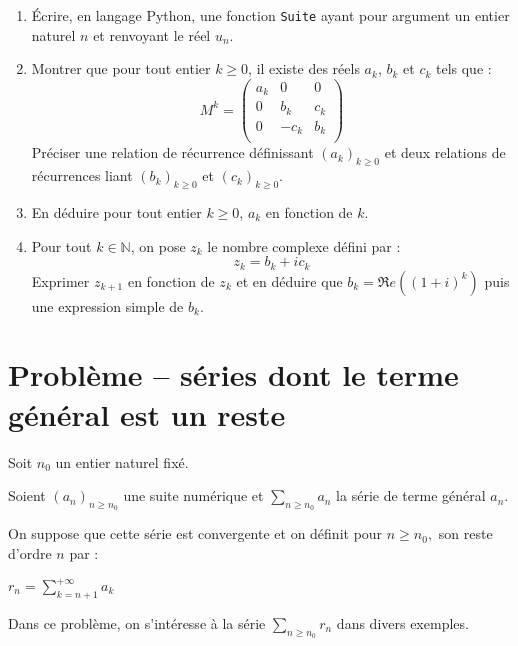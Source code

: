 \documentclass[twoside,french,11pt]{VcCours}
\begin{document}
\begin{enumerate}
\item Écrire, en langage Python, une fonction {\tt Suite} ayant pour argument un entier naturel $n$ et renvoyant le réel $u_n$.
\item Montrer que pour tout entier $k \geq 0$, il existe des réels $a_k$, $b_k$ et $c_k$ tels que :
$$ M^k = \begin{pmatrix}
a_k & 0 & 0 \\
0 & b_k & c_k \\
0 & -c_k & b_k \\
\end{pmatrix}$$
Préciser une relation de récurrence définissant $(a_k)_{k \geq 0}$ et deux relations de récurrences liant $(b_k)_{k \geq 0}$ et $(c_k)_{k \geq 0}$.
\item En déduire pour tout entier $k \geq 0$, $a_k$ en fonction de $k$.
\item Pour tout $k \in \mathbb{N}$, on pose $z_k$ le nombre complexe défini par :
$$ z_k = b_k + i c_k$$
Exprimer $z_{k+1}$ en fonction de $z_k$ et en déduire que $b_k = \Re e((1+i)^k)$ puis une expression simple de $b_k$.
\end{enumerate}

  
\section*{Problème -- séries dont le terme général est un reste}
  Soit $n_0$ un entier naturel fixé.

  Soient $(a_n)_{n\geq n_0}$ une suite numérique et $\sum_{n \geq n_0} a_n$ la
  série de terme général $a_n.$ 
  
  \medskip
  
  On suppose que cette série est convergente et on définit pour $n\geq n_0,$ son reste
  d'ordre $n$ par :
  \begin{center}$r_n=\sum_{k=n+1}^{+\infty}a_k$
  \end{center}
  Dans ce problème, on s'intéresse à la
  série $\sum_{n \geq n_0} r_n$ dans divers exemples.
  
  \medskip
  
\end{document}
